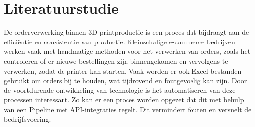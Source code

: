 






\section{Literatuurstudie}%
\label{sec:literatuurstudie}

De orderverwerking binnen 3D-printproductie is een proces dat bijdraagt aan de efficiëntie en consistentie van productie. Kleinschalige e-\-commerce bedrijven werken vaak met handmatige methoden voor het verwerken van orders, zoals het controleren of er  nieuwe bestellingen zijn binnengekomen en vervolgens te verwerken, zodat de printer kan starten. Vaak worden er ook Excel-bestanden gebruikt om orders bij te houden, wat tijdrovend en foutgevoelig kan zijn. Door de voortdurende ontwikkeling van technologie is het automatiseren van deze processen interessant. Zo kan er een proces worden opgezet dat dit met behulp van een Pipeline met API-integraties regelt. Dit vermindert fouten en versnelt de bedrijfsvoering. 

